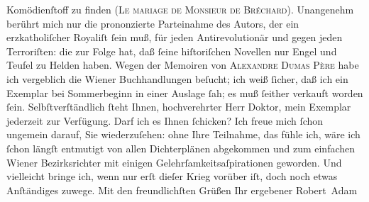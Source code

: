 \begin{ledgroupsized}[t]{13cm}
               Komödienſtoff zu finden (\textsc{Le mariage de Monsieur de Bréchard}). Unangenehm berührt mich nur die prononzierte Parteinahme des Autors, der ein
               erzkatholiſcher Royaliſt ſein muß, für jeden Antirevolutionär und gegen jeden
               Terroriſten: die zur Folge hat, daß ſeine hiſtoriſchen Novellen nur Engel und Teu{\pb}fel zu Helden haben.\pend
           \pstart
           Wegen der Memoiren von \textsc{Alexandre Dumas Père} habe ich vergeblich die Wiener
               Buchhandlungen beſucht; ich weiß ſicher, daß ich ein Exemplar bei Sommerbeginn in
               einer Auslage ſah; es muß ſeither verkauft worden ſein. Selbſtverſtändlich ſteht
               Ihnen, hochverehrter Herr Doktor, mein Exemplar jederzeit zur Verfügung. Darf ich es
               Ihnen ſchicken?\pend
           \pstart
           Ich freue mich ſchon ungemein darauf, Sie wiederzuſehen: ohne Ihre Teilnahme, das
               fühle ich, wäre ich ſchon längſt entmutigt von allen Dichterplänen abgekommen und zum
               einfachen Wiener Bezirksrichter mit einigen
               Gelehrſamkeitsaſpirationen geworden. Und vielleicht bringe ich, wenn nur erſt dieſer
               Krieg vorüber iſt, doch noch etwas Anſtändiges zuwege.\pend
           \pstart
           Mit den freundlichſten Grüßen Ihr ergebener\pend
           \pstart \spacefill\mbox{Robert Adam}\pend{}
         
         \endnumbering{}\end{ledgroupsized}  \newcommand{\dateiname}{L02241}\newcommand{\titel}{Robert Adam an Arthur Schnitzler, 24. 9. 1916}\newcommand{\editorInnen}{Martin Anton Müller und Gerd-Hermann Susen}
      